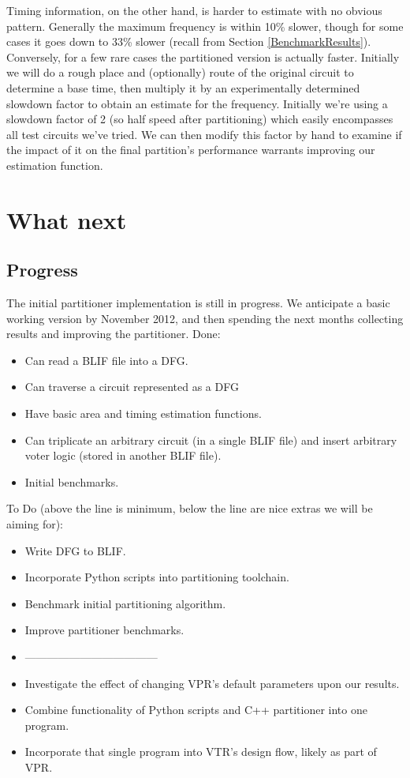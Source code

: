 \documentclass[12pt,drafta4paper,oneside]{memoir} %
\begin{document}
Timing information, on the other hand, is harder to estimate with no obvious pattern. Generally the maximum frequency is within 10\% slower, though for some cases it goes down to 33\% slower (recall from Section \ref{BenchmarkResults}). Conversely, for a few rare cases the partitioned version is actually faster. Initially we will do a rough place and (optionally) route of the original circuit to determine a base time, then multiply it by an experimentally determined slowdown factor to obtain an estimate for the frequency. Initially we're using a slowdown factor of 2 (so half speed after partitioning) which easily encompasses all test circuits we've tried. We can then modify this factor by hand to examine if the impact of it on the final partition's performance warrants improving our estimation function.

\chapter{What next}

\section{Progress}
The initial partitioner implementation is still in progress. We anticipate a basic working version by November 2012, and then spending the next months collecting results and improving the partitioner.
Done:
\begin{itemize}
    \item Can read a \ac{BLIF} file into a \ac{DFG}.
    \item Can traverse a circuit represented as a \ac{DFG}
    \item Have basic area and timing estimation functions.
    \item Can triplicate an arbitrary circuit (in a single \ac{BLIF} file) and insert arbitrary voter logic (stored in another \ac{BLIF} file).
    \item Initial benchmarks.
\end{itemize}
To Do (above the line is minimum, below the line are nice extras we will be aiming for):
\begin{itemize}
    \item Write \ac{DFG} to \ac{BLIF}.
    \item Incorporate Python scripts into partitioning toolchain.
    \item Benchmark initial partitioning algorithm.
    \item Improve partitioner benchmarks.
    \item ------------------------------------
    \item Investigate the effect of changing \ac{VPR}'s default parameters upon our results.
    \item Combine functionality of Python scripts and C++ partitioner into one program.
    \item Incorporate that single program into \ac{VTR}'s design flow, likely as part of \ac{VPR}.
\end{itemize}
\end{document}
